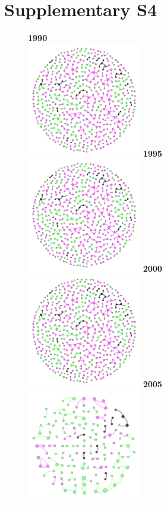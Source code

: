 \documentclass[10pt]{article}         %
\begin{document}
\section{Supplementary S4}
\begin{figure}[!htb]
    \textbf{1990}\\
    \includegraphics[width=5cm, height=5cm]{S41990.png}
  \endminipage\hfill
    \textbf{1995}\\
    \includegraphics[width=5cm, height=5cm]{S41995.png}
  \endminipage\hfill
    \textbf{2000}\\
    \includegraphics[width=5cm, height=5cm]{S42000.png}
  \endminipage\hfill
    \textbf{2005}\\
    \includegraphics[width=5cm, height=5cm]{S42005.png}

\end{figure}
\end{document}
